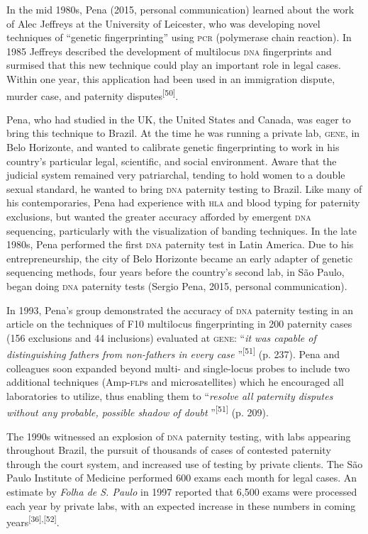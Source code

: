 \documentclass{article}
\begin{document}
In the mid 1980s, Pena (2015, personal communication) learned about the work of
Alec Jeffreys at the University of Leicester, who was developing novel
techniques of “genetic fingerprinting” using \textsc{pcr} (polymerase chain reaction). In
1985 Jeffreys described the development of multilocus \textsc{dna} fingerprints and
surmised that this new technique could play an important role in legal cases.
Within one year, this application had been used in an immigration dispute,
murder case, and paternity disputes\textsuperscript{[}\textsuperscript{50}\textsuperscript{]}.

Pena, who had studied in the UK, the United States and Canada, was eager to
bring this technique to Brazil. At the time he was running a private lab, \textsc{gene},
in Belo Horizonte, and wanted to calibrate genetic fingerprinting to work in his
country’s particular legal, scientific, and social environment. Aware that the
judicial system remained very patriarchal, tending to hold women to a double
sexual standard, he wanted to bring \textsc{dna} paternity testing to Brazil. Like many
of his contemporaries, Pena had experience with \textsc{hla} and blood typing for
paternity exclusions, but wanted the greater accuracy afforded by emergent \textsc{dna}
sequencing, particularly with the visualization of banding techniques. In the
late 1980s, Pena performed the first \textsc{dna} paternity test in Latin America. Due to
his entrepreneurship, the city of Belo Horizonte became an early adapter of
genetic sequencing methods, four years before the country’s second lab, in São
Paulo, began doing \textsc{dna} paternity tests (Sergio Pena, 2015, personal
communication).

In 1993, Pena’s group demonstrated the accuracy of \textsc{dna} paternity testing in an
article on the techniques of F10 multilocus fingerprinting in 200 paternity
cases (156 exclusions and 44 inclusions) evaluated at \textsc{gene}: “\textit{it was
capable of distinguishing fathers from non-fathers in every case}
”\textsuperscript{[}\textsuperscript{51}\textsuperscript{]}
(p. 237). Pena and colleagues soon expanded beyond multi- and single-locus
probes to include two additional techniques (Amp-\textsc{flp}s and microsatellites) which
he encouraged all laboratories to utilize, thus enabling them to
“\textit{resolve all paternity disputes without any probable, possible shadow of
doubt}
”\textsuperscript{[}\textsuperscript{51}\textsuperscript{]}
(p. 209).

The 1990s witnessed an explosion of \textsc{dna} paternity testing, with labs appearing
throughout Brazil, the pursuit of thousands of cases of contested paternity
through the court system, and increased use of testing by private clients. The
São Paulo Institute of Medicine performed 600 exams each month for legal cases.
An estimate by \textit{Folha de S. Paulo}
in 1997 reported that 6,500 exams were processed each year by private labs, with
an expected increase in these numbers in coming years\textsuperscript{[}\textsuperscript{36}\textsuperscript{]}\textsuperscript{,}\textsuperscript{[}\textsuperscript{52}\textsuperscript{]}.
\end{document}
